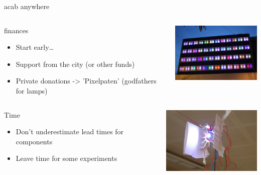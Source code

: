 \documentclass{beamer}
\begin{document}
\begin{frame}{acab anywhere}
  \begin{columns}
    \begin{column}{5cm}
      \begin{block}{finances}
        \begin{itemize}
        \item Start early\ldots
        \item Support from the city (or other funds)
        \item Private donations -> 'Pixelpaten' (godfathers for lamps)
        \end{itemize}
      \end{block}
    \end{column}
    \begin{column}{5cm}
      \includegraphics[width=5cm]{bilder/pixelpaten.JPG}
    \end{column}
  \end{columns}
  \begin{columns}
    \begin{column}{5cm}
      \begin{block}{Time}
        \begin{itemize}
        \item Don't underestimate lead times for components 
        \item Leave time for some experiments
        \end{itemize}
      \end{block}
    \end{column}
    \begin{column}{5cm}
      \includegraphics[width=5cm]{bilder/rumprobieren.JPG}
    \end{column}
  \end{columns}
\end{frame}
\end{document}
